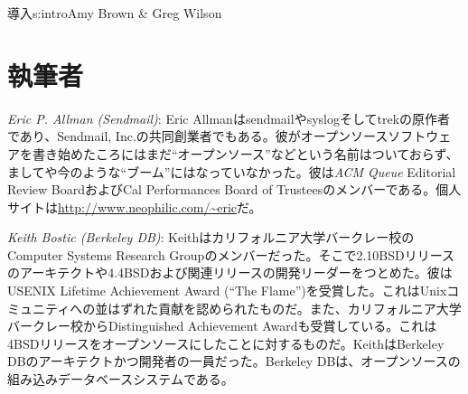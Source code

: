 \begin{aosachapter}{導入}{s:intro}{Amy Brown \& Greg Wilson}
\section*{執筆者}

\indent \indent \emph{Eric P\@. Allman (Sendmail)}: Eric Allmanはsendmailやsyslogそしてtrekの原作者であり、Sendmail, Inc.の共同創業者でもある。彼がオープンソースソフトウェアを書き始めたころにはまだ``オープンソース''などという名前はついておらず、ましてや今のような``ブーム''にはなっていなかった。彼は\emph{ACM Queue} Editorial Review BoardおよびCal Performances Board of Trusteesのメンバーである。個人サイトは\url{http://www.neophilic.com/~eric}だ。


\emph{Keith Bostic (Berkeley DB)}: Keithはカリフォルニア大学バークレー校のComputer Systems Research Groupのメンバーだった。そこで2.10BSDリリースのアーキテクトや4.4BSDおよび関連リリースの開発リーダーをつとめた。彼はUSENIX Lifetime Achievement Award (``The Flame'')を受賞した。これはUnixコミュニティへの並はずれた貢献を認められたものだ。また、カリフォルニア大学バークレー校からDistinguished Achievement Awardも受賞している。これは4BSDリリースをオープンソースにしたことに対するものだ。KeithはBerkeley DBのアーキテクトかつ開発者の一員だった。Berkeley DBは、オープンソースの組み込みデータベースシステムである。


\end{aosachapter}
